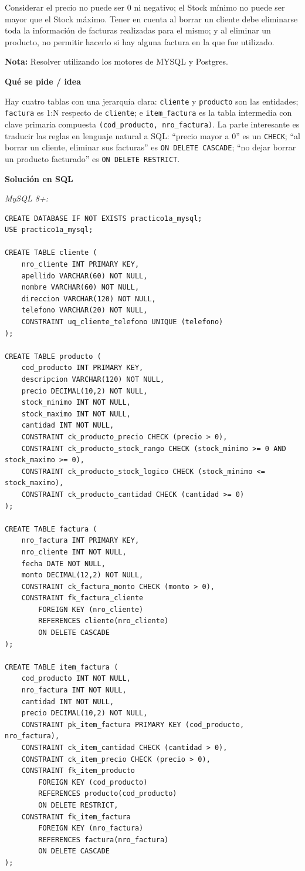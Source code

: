 \documentclass[11pt,a4paper]{article}
\newcommand{\itemcabecera}[1]{\noindent\textbf{#1}\par\medskip}
\newcommand{\bloqueIdea}{\itemcabecera{Qu\'e se pide / idea}}
\newcommand{\bloqueSolucion}{\itemcabecera{Soluci\'on en SQL}}
\begin{document}
Considerar el precio no puede ser 0 ni negativo; el Stock mínimo no puede ser mayor que el Stock máximo. Tener en cuenta al borrar un cliente debe eliminarse toda la información de facturas realizadas para el mismo; y al eliminar un producto, no permitir hacerlo si hay alguna factura en la que fue utilizado.

\textbf{Nota:} Resolver utilizando los motores de MYSQL y Postgres.

\bloqueIdea

Hay cuatro tablas con una jerarquía clara: \texttt{cliente} y \texttt{producto} son las entidades; \texttt{factura} es 1:N respecto de \texttt{cliente}; e \texttt{item\_factura} es la tabla intermedia con clave primaria compuesta \texttt{(cod\_producto, nro\_factura)}. La parte interesante es traducir las reglas en lenguaje natural a SQL: ``precio mayor a 0'' es un \texttt{CHECK}; ``al borrar un cliente, eliminar sus facturas'' es \texttt{ON DELETE CASCADE}; ``no dejar borrar un producto facturado'' es \texttt{ON DELETE RESTRICT}.

\bloqueSolucion

\textit{MySQL 8+:}

\begin{lstlisting}
CREATE DATABASE IF NOT EXISTS practico1a_mysql;
USE practico1a_mysql;

CREATE TABLE cliente (
    nro_cliente INT PRIMARY KEY,
    apellido VARCHAR(60) NOT NULL,
    nombre VARCHAR(60) NOT NULL,
    direccion VARCHAR(120) NOT NULL,
    telefono VARCHAR(20) NOT NULL,
    CONSTRAINT uq_cliente_telefono UNIQUE (telefono)
);

CREATE TABLE producto (
    cod_producto INT PRIMARY KEY,
    descripcion VARCHAR(120) NOT NULL,
    precio DECIMAL(10,2) NOT NULL,
    stock_minimo INT NOT NULL,
    stock_maximo INT NOT NULL,
    cantidad INT NOT NULL,
    CONSTRAINT ck_producto_precio CHECK (precio > 0),
    CONSTRAINT ck_producto_stock_rango CHECK (stock_minimo >= 0 AND stock_maximo >= 0),
    CONSTRAINT ck_producto_stock_logico CHECK (stock_minimo <= stock_maximo),
    CONSTRAINT ck_producto_cantidad CHECK (cantidad >= 0)
);

CREATE TABLE factura (
    nro_factura INT PRIMARY KEY,
    nro_cliente INT NOT NULL,
    fecha DATE NOT NULL,
    monto DECIMAL(12,2) NOT NULL,
    CONSTRAINT ck_factura_monto CHECK (monto > 0),
    CONSTRAINT fk_factura_cliente
        FOREIGN KEY (nro_cliente)
        REFERENCES cliente(nro_cliente)
        ON DELETE CASCADE
);

CREATE TABLE item_factura (
    cod_producto INT NOT NULL,
    nro_factura INT NOT NULL,
    cantidad INT NOT NULL,
    precio DECIMAL(10,2) NOT NULL,
    CONSTRAINT pk_item_factura PRIMARY KEY (cod_producto, nro_factura),
    CONSTRAINT ck_item_cantidad CHECK (cantidad > 0),
    CONSTRAINT ck_item_precio CHECK (precio > 0),
    CONSTRAINT fk_item_producto
        FOREIGN KEY (cod_producto)
        REFERENCES producto(cod_producto)
        ON DELETE RESTRICT,
    CONSTRAINT fk_item_factura
        FOREIGN KEY (nro_factura)
        REFERENCES factura(nro_factura)
        ON DELETE CASCADE
);
\end{lstlisting}
\end{document}
